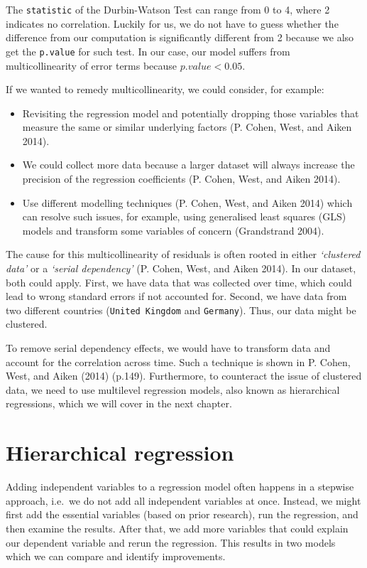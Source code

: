\documentclass[
  letterpaper,
]{krantz}
\begin{document}
The \texttt{statistic} of the Durbin-Watson Test can range from 0 to 4,
where 2 indicates no correlation. Luckily for us, we do not have to
guess whether the difference from our computation is significantly
different from 2 because we also get the \texttt{p.value} for such test.
In our case, our model suffers from multicollinearity of error terms
because \(p.value < 0.05\).

If we wanted to remedy multicollinearity, we could consider, for
example:

\begin{itemize}
\item
  Revisiting the regression model and potentially dropping those
  variables that measure the same or similar underlying factors (P.
  Cohen, West, and Aiken 2014).
\item
  We could collect more data because a larger dataset will always
  increase the precision of the regression coefficients (P. Cohen, West,
  and Aiken 2014).
\item
  Use different modelling techniques (P. Cohen, West, and Aiken 2014)
  which can resolve such issues, for example, using generalised least
  squares (GLS) models and transform some variables of concern
  (Grandstrand 2004).
\end{itemize}

The cause for this multicollinearity of residuals is often rooted in
either \emph{`clustered data'} or a \emph{`serial dependency'} (P.
Cohen, West, and Aiken 2014). In our dataset, both could apply. First,
we have data that was collected over time, which could lead to wrong
standard errors if not accounted for. Second, we have data from two
different countries (\texttt{United\ Kingdom} and \texttt{Germany}).
Thus, our data might be clustered.

To remove serial dependency effects, we would have to transform data and
account for the correlation across time. Such a technique is shown in P.
Cohen, West, and Aiken (2014) (p.149). Furthermore, to counteract the
issue of clustered data, we need to use multilevel regression models,
also known as hierarchical regressions, which we will cover in the next
chapter.

\section{Hierarchical regression}\label{sec-hierarchical-regression}

Adding independent variables to a regression model often happens in a
stepwise approach, i.e.~we do not add all independent variables at once.
Instead, we might first add the essential variables (based on prior
research), run the regression, and then examine the results. After that,
we add more variables that could explain our dependent variable and
rerun the regression. This results in two models which we can compare
and identify improvements.
\end{document}
